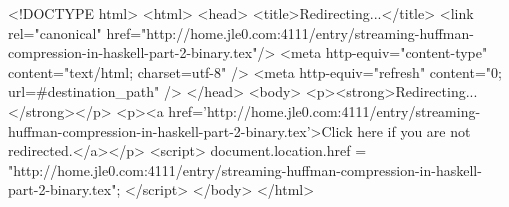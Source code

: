 <!DOCTYPE html>
<html>
<head>
<title>Redirecting...</title>
<link rel="canonical" href="http://home.jle0.com:4111/entry/streaming-huffman-compression-in-haskell-part-2-binary.tex"/>
<meta http-equiv="content-type" content="text/html; charset=utf-8" />
<meta http-equiv="refresh" content="0; url=#{destination_path}" />
</head>
<body>
  <p><strong>Redirecting...</strong></p>
  <p><a href='http://home.jle0.com:4111/entry/streaming-huffman-compression-in-haskell-part-2-binary.tex'>Click here if you are not redirected.</a></p>
  <script>
    document.location.href = "http://home.jle0.com:4111/entry/streaming-huffman-compression-in-haskell-part-2-binary.tex";
  </script>
</body>
</html>
